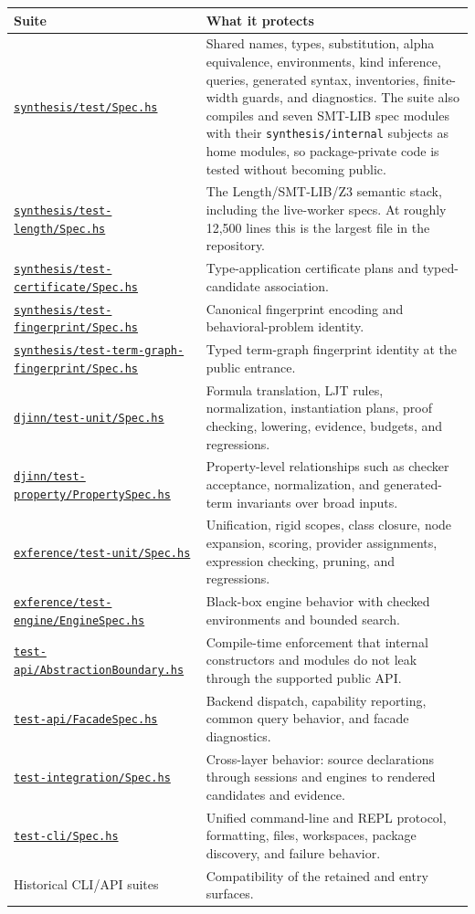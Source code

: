 \documentclass[10pt,letterpaper,oneside]{report}
\newcommand{\code}[1]{\texttt{\detokenize{#1}}}
\newcommand{\filepath}[1]{\nolinkurl{#1}}
\def\DjexBase{https://github.com/VladimirReshetnikov/Djex/blob/d3d9662598460316bdcd177ce6768c521e764aa8/}
\newcommand{\dpath}[1]{\href{\DjexBase#1}{\nolinkurl{#1}}}
\begin{document}
\begin{longtable}{@{}L{0.28\textwidth}L{0.64\textwidth}@{}}
\toprule
\textbf{Suite} & \textbf{What it protects} \\
\midrule
\endhead
\dpath{synthesis/test/Spec.hs} & Shared names, types, substitution, alpha equivalence, environments, kind inference, queries, generated syntax, inventories, finite-width guards, and diagnostics. The suite also compiles \code{ClassResolutionSpec} and seven SMT-LIB spec modules with their \filepath{synthesis/internal} subjects as home modules, so package-private code is tested without becoming public. \\
\dpath{synthesis/test-length/Spec.hs} & The Length/SMT-LIB/Z3 semantic stack, including the live-worker specs. At roughly 12{,}500 lines this is the largest file in the repository. \\
\dpath{synthesis/test-certificate/Spec.hs} & Type-application certificate plans and typed-candidate association. \\
\dpath{synthesis/test-fingerprint/Spec.hs} & Canonical fingerprint encoding and behavioral-problem identity. \\
\dpath{synthesis/test-term-graph-fingerprint/Spec.hs} & Typed term-graph fingerprint identity at the public entrance. \\
\dpath{djinn/test-unit/Spec.hs} & Formula translation, LJT rules, normalization, instantiation plans, proof checking, lowering, evidence, budgets, and regressions. \\
\dpath{djinn/test-property/PropertySpec.hs} & Property-level relationships such as checker acceptance, normalization, and generated-term invariants over broad inputs. \\
\dpath{exference/test-unit/Spec.hs} & Unification, rigid scopes, class closure, node expansion, scoring, provider assignments, expression checking, pruning, and regressions. \\
\dpath{exference/test-engine/EngineSpec.hs} & Black-box engine behavior with checked environments and bounded search. \\
\dpath{test-api/AbstractionBoundary.hs} & Compile-time enforcement that internal constructors and modules do not leak through the supported public API. \\
\dpath{test-api/FacadeSpec.hs} & Backend dispatch, capability reporting, common query behavior, and facade diagnostics. \\
\dpath{test-integration/Spec.hs} & Cross-layer behavior: source declarations through sessions and engines to rendered candidates and evidence. \\
\dpath{test-cli/Spec.hs} & Unified command-line and REPL protocol, formatting, files, workspaces, package discovery, and failure behavior. \\
Historical CLI/API suites & Compatibility of the retained \code{djinn} and \code{exference} entry surfaces. \\
\bottomrule
\end{longtable}
\end{document}
